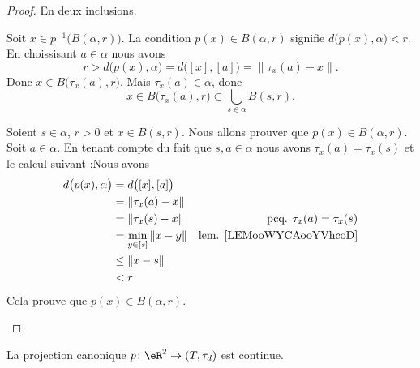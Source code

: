 \begin{proof}
	En deux inclusions.
	\begin{subproof}
		Soit \( x\in p^{-1}\big( B(\alpha,r) \big)\). La condition \( p(x)\in B(\alpha,r)\) signifie \( d\big( p(x),\alpha \big)<r\). En choissisant \( a\in \alpha\) nous avons
		\begin{equation}
			r>d\big( p(x),\alpha \big)=d\big( [x],[a] \big)=\| \tau_x(a)-x \|.
		\end{equation}
		Donc \( x\in B\big( \tau_x(a),r \big)\). Mais \( \tau_x(a)\in \alpha\), donc
		\begin{equation}
			x\in B\big( \tau_x(a),r \big)\subset\bigcup_{s\in \alpha}B(s,r).
		\end{equation}

		Soient \( s\in \alpha\), \( r>0\) et \( x\in B(s,r)\). Nous allons prouver que \( p(x)\in B(\alpha,r)\). Soit \( a\in \alpha\). En tenant compte du fait que \( s,a\in \alpha\) nous avons \( \tau_x(a)=\tau_x(s)\) et le calcul suivant :Nous avons
		\begin{subequations}
			\begin{align}
				d\big( p(x),\alpha \big) & =d\big( [x],[a] \big)                                           \\
				                         & =\| \tau_x(a)-x \|                                              \\
				                         & =\| \tau_x(s)-x \|        & \text{pcq. } \tau_x(a)=\tau_x(s)    \\
				                         & =\min_{y\in [s]}\| x-y \| & \text{lem. \ref{LEMooWYCAooYVhcoD}} \\
				                         & \leq \| x-s \|                                                  \\
				                         & <r
			\end{align}
		\end{subequations}
		Cela prouve que \( p(x)\in B(\alpha,r)\).
	\end{subproof}
\end{proof}

\begin{lemma}	\label{LEMooQQZMooMpdZTU}
	La projection canonique \(p \colon \eR^2\to (T,\tau_d)  \) est continue.
\end{lemma}

